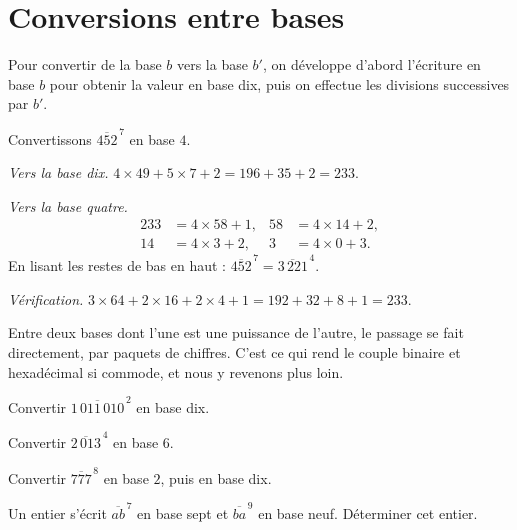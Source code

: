 \section{Conversions entre bases}

\begin{propriete}
Pour convertir de la base $b$ vers la base $b'$, on développe d'abord
l'écriture en base $b$ pour obtenir la valeur en base dix, puis on effectue
les divisions successives par $b'$.
\end{propriete}

\begin{exemple}
Convertissons $\overline{452}^{\,7}$ en base $4$.

\emph{Vers la base dix.} $4\times49+5\times7+2 = 196+35+2 = 233$.

\emph{Vers la base quatre.}
\[
\begin{aligned}
  233 &= 4\times58+1, & 58 &= 4\times14+2, \\
  14  &= 4\times3+2,  & 3  &= 4\times0+3 .
\end{aligned}
\]
En lisant les restes de bas en haut : $\overline{452}^{\,7} =
\overline{3\,221}^{\,4}$.

\emph{Vérification.} $3\times64+2\times16+2\times4+1 = 192+32+8+1 = 233$.
\end{exemple}

\begin{remarque}
Entre deux bases dont l'une est une puissance de l'autre, le passage se fait
directement, par paquets de chiffres. C'est ce qui rend le couple binaire et
hexadécimal si commode, et nous y revenons plus loin.
\end{remarque}

\begin{entrainement}[conversions]
\exo[\niveau{1}] Convertir $\overline{1\,011\,010}^{\,2}$ en base dix.

\exo[\niveau{2}] Convertir $\overline{2\,013}^{\,4}$ en base $6$.

\exo[\niveau{2}] Convertir $\overline{777}^{\,8}$ en base $2$, puis en base
dix.

\exo[\niveau{3}] Un entier s'écrit $\overline{ab}^{\,7}$ en base sept et
$\overline{ba}^{\,9}$ en base neuf. Déterminer cet entier.
\end{entrainement}

